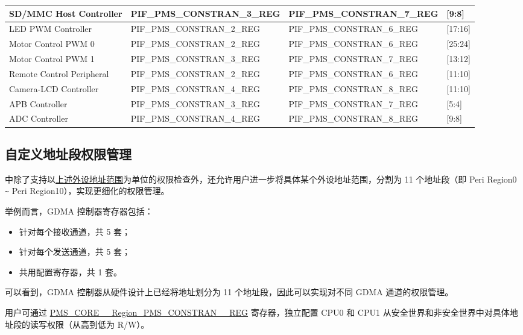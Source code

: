 \documentclass[main\_\_CN.tex]{subfiles}
\begin{document}
\begin{ThreePartTable}
\begin{longtable}[c]{ |l|l|l|l| }
    SD/MMC Host Controller & PIF\_PMS\_CONSTRAN\_3\_REG & PIF\_PMS\_CONSTRAN\_7\_REG & [9:8] \\\hline
    LED PWM Controller  & PIF\_PMS\_CONSTRAN\_2\_REG & PIF\_PMS\_CONSTRAN\_6\_REG & [17:16] \\\hline
    Motor Control PWM 0 & PIF\_PMS\_CONSTRAN\_2\_REG & PIF\_PMS\_CONSTRAN\_6\_REG & [25:24] \\\hline
    Motor Control PWM 1 & PIF\_PMS\_CONSTRAN\_3\_REG & PIF\_PMS\_CONSTRAN\_7\_REG & [13:12] \\\hline
    Remote Control Peripheral  & PIF\_PMS\_CONSTRAN\_2\_REG & PIF\_PMS\_CONSTRAN\_6\_REG & [11:10] \\\hline
    Camera-LCD Controller & PIF\_PMS\_CONSTRAN\_4\_REG & PIF\_PMS\_CONSTRAN\_8\_REG & [11:10] \\\hline
    APB Controller & PIF\_PMS\_CONSTRAN\_3\_REG & PIF\_PMS\_CONSTRAN\_7\_REG & [5:4] \\\hline
    ADC Controller & PIF\_PMS\_CONSTRAN\_4\_REG & PIF\_PMS\_CONSTRAN\_8\_REG & [9:8] \\\hline
\end{longtable}
\end{ThreePartTable}


\subsection{自定义地址段权限管理}


\chipname{} 中除了支持以\hyperref[sec:permctrl-peri-address]{上述外设地址范围}为单位的权限检查外，还允许用户进一步将具体某个外设地址范围，分割为 11 个地址段（即 Peri Region0 \verb+~+ Peri Region10），实现更细化的权限管理。

举例而言，GDMA 控制器寄存器包括：
\begin{itemize}
    \item 针对每个接收通道，共 5 套；
    \item 针对每个发送通道，共 5 套；
    \item 共用配置寄存器，共 1 套。
\end{itemize}

可以看到，GDMA 控制器从硬件设计上已经将地址划分为 11 个地址段，因此可以实现对不同 GDMA 通道的权限管理。

用户可通过 \hyperref[regdesc:PMSCORE0REGIONPMSCONSTRAIN1REG]{PMS\_CORE\_\_Region\_PMS\_CONSTRAN\_\_REG} 寄存器，独立配置 CPU0 和 CPU1 从安全世界和非安全世界中对具体地址段的读写权限（从高到低为 R/W）。
\end{document}
